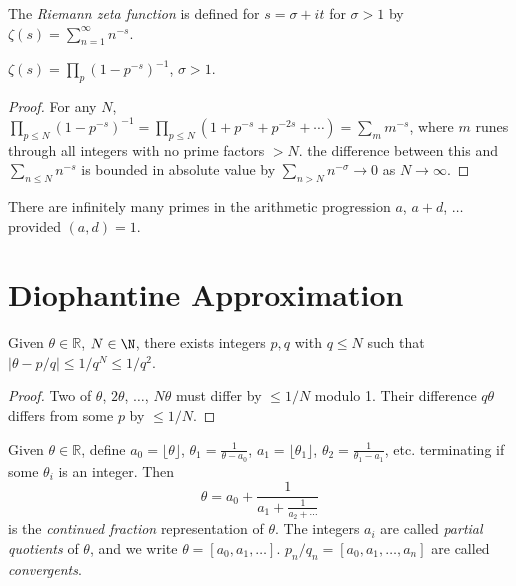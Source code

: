 \documentclass[a4paper, 10pt]{amsart}
\begin{document}
\begin{definition}
    The \emph{Riemann zeta function} is defined for $s = \sigma + it$ for $\sigma > 1$ by
        $\zeta(s) = \sum_{n = 1}^\infty n^{-s}$.
\end{definition}

\begin{theorem}
$\zeta(s) = \prod_p (1 - p^{-s})^{-1}$, $\sigma > 1$.
\end{theorem}
\begin{proof}
    For any $N$, $\prod_{p \leq N} (1 - p^{-s})^{-1} = \prod_{p \leq N} (1 + p^{-s}+ p^{-2s} + \cdots) = \sum_m m^{-s}$, where $m$ runes through all integers with no prime factors $> N$. the difference between this and $\sum_{n \leq N} n^{-s}$ is bounded in absolute value by $\sum_{n > N} n^{-\sigma} \rightarrow 0$ as $N \rightarrow \infty$.
\end{proof}

\begin{theorem}
There are infinitely many primes in the arithmetic progression $a$, $a + d$, $\dots$ provided $(a, d) = 1$.   
\end{theorem}

\section{Diophantine Approximation}

\begin{theorem}[Dirichlet]
Given $\theta \in \mathbb{R}$, $N \in \N$, there exists integers $p, q$ with $q \leq N$ such that $|\theta - p/q| \leq 1/q^N \leq 1/q^2$.
\end{theorem}
\begin{proof}
    Two of $\theta$, $2\theta$, $\dots$, $N\theta$ must differ by $\leq 1/N$ modulo 1. Their difference $q \theta$ differs from some $p$ by $\leq 1/N$.
\end{proof}

\begin{definition}
    Given $\theta \in \mathbb{R}$, define $a_0 = \lfloor \theta \rfloor$, $\theta_1 = \frac{1}{\theta - a_0}$, $a_1 = \lfloor \theta_1 \rfloor$, $\theta_2 = \frac{1}{\theta_1 - a_1}$, etc. terminating if some $\theta_i$ is an integer. Then
    $$
    \theta = a_0 + \frac{1}{a_1 + \frac{1}{a_2 +\cdots}}
    $$
    is the \emph{continued fraction} representation of $\theta$. The integers $a_i$ are called \emph{partial quotients} of $\theta$, and we write $\theta = [a_0, a_1, \dots]$. $p_n/q_n = [a_0, a_1, \dots, a_n]$ are called \emph{convergents}.
\end{definition}
\end{document}

